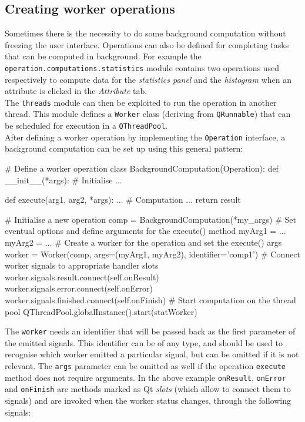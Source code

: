 \subsection{Creating worker operations}\label{ssec:worker-operation}
Sometimes there is the necessity to do some background computation without freezing the user interface. Operations can also be defined for completing tasks that can be computed in background. For example the \texttt{operation.computations.statistics} module contains two operations used respectively to compute data for the \textit{statistics panel} and the \textit{histogram} when an attribute is clicked in the \textit{Attribute} tab.\\
The \texttt{threads} module can then be exploited to run the operation in another thread. This module defines a \texttt{Worker} class (deriving from \texttt{QRunnable}) that can be scheduled for execution in a \texttt{QThreadPool}.\\
After defining a worker operation by implementing the \texttt{Operation} interface, a background computation can be set up using this general pattern:
\begin{python}
	# Define a worker operation
	class BackgroundComputation(Operation):
	def __init__(*args):
	# Initialise
	...
	
	def execute(arg1, arg2, *args):
	...
	# Computation
	...
	return result
	
	# Initialise a new operation
	comp = BackgroundComputation(*my_args)
	# Set eventual options and define arguments for the execute() method
	myArg1 = ...
	myArg2 = ...
	# Create a worker for the operation and set the execute() args
	worker = Worker(comp, args=(myArg1, myArg2), identifier='comp1')
	# Connect worker signals to appropriate handler slots
	worker.signals.result.connect(self.onResult)
	worker.signals.error.connect(self.onError)
	worker.signals.finished.connect(self.onFinish)
	# Start computation on the thread pool
	QThreadPool.globalInstance().start(statWorker)
\end{python}
The \texttt{worker} needs an identifier that will be passed back as the first parameter of the emitted signals. This identifier can be of any type, and should be used to recognise which worker emitted a particular signal, but can be omitted if it is not relevant. The \texttt{args} parameter can be omitted as well if the operation \texttt{execute} method does not require arguments. In the above example \texttt{onResult}, \texttt{onError} and \texttt{onFinish} are methods marked as Qt \textit{slots} (which allow to connect them to signals) and are invoked when the worker status changes, through the following signals:
